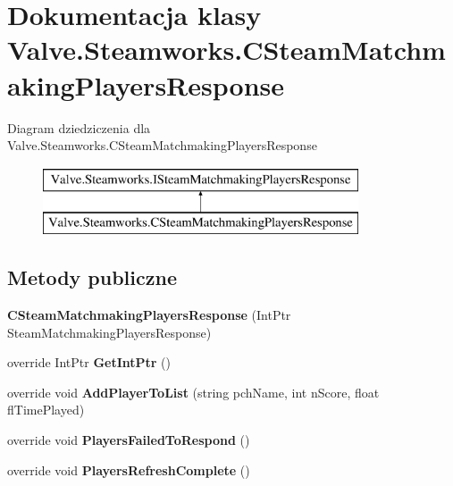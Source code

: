 \hypertarget{class_valve_1_1_steamworks_1_1_c_steam_matchmaking_players_response}{}\section{Dokumentacja klasy Valve.\+Steamworks.\+C\+Steam\+Matchmaking\+Players\+Response}
\label{class_valve_1_1_steamworks_1_1_c_steam_matchmaking_players_response}
Diagram dziedziczenia dla Valve.\+Steamworks.\+C\+Steam\+Matchmaking\+Players\+Response\begin{figure}[H]
\begin{center}
\leavevmode
\includegraphics[height=2.000000cm]{class_valve_1_1_steamworks_1_1_c_steam_matchmaking_players_response}
\end{center}
\end{figure}
\subsection*{Metody publiczne}
\begin{DoxyCompactItemize}
\item 
\mbox{\label{class_valve_1_1_steamworks_1_1_c_steam_matchmaking_players_response_ac06725cc9c328019b9215f0d25ac574b}} 
{\bfseries C\+Steam\+Matchmaking\+Players\+Response} (Int\+Ptr Steam\+Matchmaking\+Players\+Response)
\item 
\mbox{\label{class_valve_1_1_steamworks_1_1_c_steam_matchmaking_players_response_ab55fe10368500b8bee2d96f5159e53ad}} 
override Int\+Ptr {\bfseries Get\+Int\+Ptr} ()
\item 
\mbox{\label{class_valve_1_1_steamworks_1_1_c_steam_matchmaking_players_response_a65096b5cc1c1172a8fdcac5245682a5b}} 
override void {\bfseries Add\+Player\+To\+List} (string pch\+Name, int n\+Score, float fl\+Time\+Played)
\item 
\mbox{\label{class_valve_1_1_steamworks_1_1_c_steam_matchmaking_players_response_a774ff4b30eaa290ae090effa407496f0}} 
override void {\bfseries Players\+Failed\+To\+Respond} ()
\item 
\mbox{\label{class_valve_1_1_steamworks_1_1_c_steam_matchmaking_players_response_aa27e8a63cd44980317af3cc95ddf8a2d}} 
override void {\bfseries Players\+Refresh\+Complete} ()
\end{DoxyCompactItemize}


